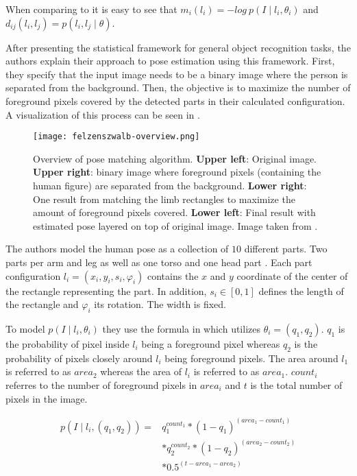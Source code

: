 When comparing  to  it is easy to see that $m_i(l_i) = - log ~ p(I \mid l_i, \theta_i)$ and $d_{ij}(l_i, l_j) = p(l_i, l_j \mid \theta)$.

After presenting the statistical framework for general object recognition tasks, the authors explain their approach to pose estimation using this framework.
First, they specify that the input image needs to be a binary image where the person is separated from the background.
Then, the objective is to maximize the number of foreground pixels covered by the detected parts in their calculated configuration.
A visualization of this process can be seen in .

\begin{figure}[htb!]
    \centering
    \texttt{[image: felzenszwalb-overview.png]}
    \caption{Overview of pose matching algorithm. \textbf{Upper left}: Original image. \textbf{Upper right}: binary image where foreground pixels (containing the human figure) are separated from the background. \textbf{Lower right}: One result from matching the limb rectangles to maximize the amount of foreground pixels covered. \textbf{Lower left}: Final result with estimated pose layered on top of original image. Image taken from \cite{felzenszwalb_pictorial_2005}.}
    \label{fig:felzenszwalb-overview}
\end{figure}

The authors model the human pose as a collection of $10$ different parts. 
Two parts per arm and leg as well as one torso and one head part .
Each part configuration $l_i = (x_i, y_i, s_i , \varphi_i)$ contains the $x$ and $y$ coordinate of the center of the rectangle representing the part.
In addition, $s_i \in [0,1]$ defines the length of the rectangle and $\varphi_i$ its rotation.
The width is fixed.

To model $p(I \mid l_i, \theta_i)$ they use the formula in  which utilizes $\theta_i = (q_1, q_2)$.
$q_1$ is the probability of pixel inside $l_i$ being a foreground pixel whereas $q_2$ is the probability of pixels closely around $l_i$ being foreground pixels.
The area around $l_1$ is referred to as $area_2$ whereas the area of $l_i$ is referred to as $area_1$.
$count_i$ referres to the number of foreground pixels in $area_i$ and $t$ is the total number of pixels in the image.

\begin{equation}
    \label{eq:felz-unary}
    \begin{split}
        p(I \mid l_i, (q_1, q_2)) = &q_1^{count_1} * (1 - q_1)^{(area_1 - count_1)} \\ 
        &* q_2^{count_2} * (1 - q_2)^{(area_2 - count_2)} \\ 
        &* 0.5^{(t - area_1 - area_2)}
    \end{split}
\end{equation}

